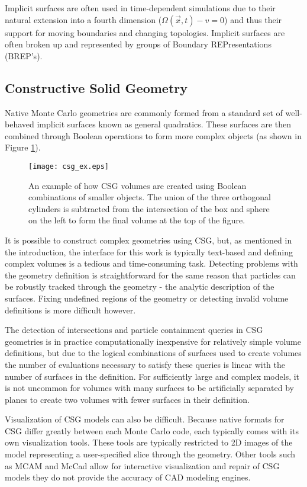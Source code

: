 Implicit surfaces are often used in time-dependent simulations due to their
natural extension into a fourth dimension ($ \Omega(\vec{x},t) - v  = 0 $) and
thus their support for moving boundaries and changing topologies. Implicit
surfaces are often broken up and represented by groups of Boundary
REPresentations (BREP's). 

\subsection{Constructive Solid Geometry}\label{subsec:csg}

Native Monte Carlo geometries are commonly formed from a standard set of
well-behaved implicit surfaces known as general quadratics. These surfaces are
then combined through Boolean operations to form more complex objects (as shown
in Figure \ref{fig:csg_ex}).

\begin{figure}[h]
  \centering
  \texttt{[image: csg\_ex.eps]}
  \caption{An example of how CSG volumes are created using Boolean combinations
    of smaller objects. The union of the three orthogonal cylinders is
    subtracted from the intersection of the box and sphere on the left to form
    the final volume at the top of the figure.}
  \label{fig:csg_ex}
\end{figure}

It is possible to construct complex geometries using CSG, but, as mentioned in
the introduction, the interface for this work is typically text-based and
defining complex volumes is a tedious and time-consuming task. Detecting
problems with the geometry definition is straightforward for the same reason
that particles can be robustly tracked through the geometry - the analytic
description of the surfaces. Fixing undefined regions of the geometry or
detecting invalid volume definitions is more difficult however.

The detection of intersections and particle containment queries in CSG
geometries is in practice computationally inexpensive for relatively simple
volume definitions, but due to the logical combinations of surfaces used to
create volumes the number of evaluations necessary to satisfy these queries is
linear with the number of surfaces in the definition. For sufficiently large and
complex models, it is not uncommon for volumes with many surfaces to be
artificially separated by planes to create two volumes with fewer surfaces in
their definition.

Visualization of CSG models can also be difficult. Because native formats for
CSG differ greatly between each Monte Carlo code, each typically comes with its
own visualization tools. These tools are typically restricted to 2D images of
the model representing a user-specified slice through the geometry. Other tools
such as MCAM \cite{Liu_2005} and McCad \cite{Tsigetamirat_2008} allow for
interactive visualization and repair of CSG models they do not provide the
accuracy of CAD modeling engines.


